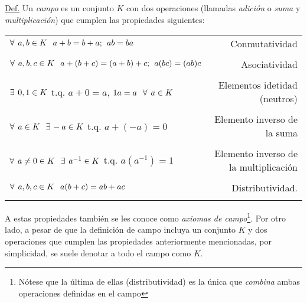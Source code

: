 \documentclass[12pt]{article}
\begin{document}
\begin{tcolorbox}
\underline{Def.} Un \emph{campo} es un conjunto $K$ con dos operaciones (llamadas \emph{adición} o \emph{suma} y \emph{multiplicación}) que cumplen las propiedades siguientes:

\begin{center}
\begin{tabular}{lr}
    \\
    $\forall\hspace{1.5mm}a,b\in K\hspace{2.5mm} a+b=b+a;\hspace{1.5mm} ab = ba
    $ & Conmutatividad \\ \\
    $\forall\hspace{1.5mm}a,b,c\in K\hspace{2.5mm}a+(b+c)=(a+b)+c;\hspace{1.5mm}a(bc)=(ab)c$ & Asociatividad \\ \\
    $\exists\hspace{1.5mm} 0,1\in K$ t.q. $a+0=a$, $1a=a\hspace{2.5mm} \forall\hspace{1.5mm}a \in K$ & Elementos idetidad (neutros) \\ \\
    $\forall\hspace{1.5mm}a\in K\hspace{2.5mm}\exists\hspace{0.5mm}-a\in K$ t.q. $a + (-a) = 0$ & Elemento inverso de la suma \\ \\
    $\forall\hspace{1.5mm}a\neq0\in K \hspace{2.5mm} \exists\hspace{1.5mm}a^{-1}\in K$ t.q. $a(a^{-1})= 1$ & Elemento inverso de la multiplicación \\ \\
    $\forall\hspace{1.5mm}a,b,c\in K\hspace{2.5mm}a(b+c) = ab+ac$ & Distributividad.\\ \\
\end{tabular}
\end{center}

\noindent A estas propiedades también se les conoce como \emph{axiomas de campo}\footnote{Nótese que la última de ellas (distributividad) es la única que \emph{combina} ambas operaciones definidas en el campo}. Por otro lado, a pesar de que la definición de campo incluya un conjunto $K$ y dos operaciones que cumplen las propiedades anteriormente mencionadas, por simplicidad, se suele denotar a todo el campo como $K$.
\end{tcolorbox}
\end{document}

